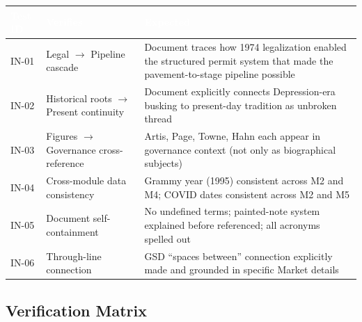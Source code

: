 \documentclass[11pt,letterpaper]{article}
\newcommand{\tableheader}[1]{\textbf{\sffamily\textcolor{white}{#1}}}
\begin{document}
\begin{center}
\begin{tabularx}{\textwidth}{L{1.5cm}L{5cm}X}
\toprule
{}
\tableheader{Test ID} & \tableheader{Verifies} & \tableheader{Expected} \\
\midrule
IN-01 & Legal $\rightarrow$ Pipeline cascade & Document traces how 1974 legalization enabled the structured permit system that made the pavement-to-stage pipeline possible \\
IN-02 & Historical roots $\rightarrow$ Present continuity & Document explicitly connects Depression-era busking to present-day tradition as unbroken thread \\
IN-03 & Figures $\rightarrow$ Governance cross-reference & Artis, Page, Towne, Hahn each appear in governance context (not only as biographical subjects) \\
IN-04 & Cross-module data consistency & Grammy year (1995) consistent across M2 and M4; COVID dates consistent across M2 and M5 \\
IN-05 & Document self-containment & No undefined terms; painted-note system explained before referenced; all acronyms spelled out \\
IN-06 & Through-line connection & GSD ``spaces between'' connection explicitly made and grounded in specific Market details \\
\bottomrule
\end{tabularx}
\end{center}

\subsection{Verification Matrix}
\end{document}
